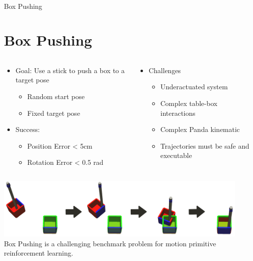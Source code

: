\documentclass[16:9,en,navbarinfooter]{sdqbeamer}
\begin{document}
\begin{frame}{Box Pushing}
	\section{Box Pushing}

	\vspace{1cm}
	\begin{columns}
		\begin{column}{0.5\textwidth}
			\begin{itemize}
				\item Goal: Use a stick to push a box to a target pose
				      \begin{itemize}
					      \item Random start pose
					      \item Fixed target pose
				      \end{itemize}
				\item Success:
				      \begin{itemize}
					      \item Position Error < 5cm
					      \item Rotation Error < 0.5 rad

				      \end{itemize}
			\end{itemize}
		\end{column}
		\begin{column}{0.5\textwidth}
			\begin{itemize}
				\item Challenges
				      \begin{itemize}
					      \item Underactuated system
					      \item Complex table-box interactions
					      \item Complex Panda kinematic
					      \item Trajectories must be safe and executable
				      \end{itemize}
			\end{itemize}
		\end{column}


	\end{columns}
	\center
	\includegraphics[height=3cm]{media/2dboxpushing.png}
	\vspace{.1cm}\\
	Box Pushing is a challenging benchmark problem for motion primitive reinforcement learning.
\end{frame}
\end{document}

